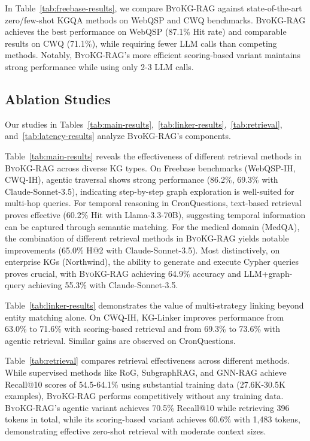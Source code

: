 \documentclass[11pt]{article}
\newcommand{\byokg}{\textsc{ByoKG-RAG}\xspace}
\newcommand{\glink}{KG-Linker\xspace}
\begin{document}


In Table~\ref{tab:freebase-results}, we compare \byokg against state-of-the-art zero/few-shot KGQA methods on WebQSP and CWQ benchmarks. \byokg achieves the best performance on WebQSP (87.1\% Hit rate) and comparable results on CWQ (71.1\%), while requiring fewer LLM calls than competing methods. Notably,  \byokg's more efficient scoring-based variant maintains strong performance while using only 2-3 LLM calls.





\subsection{Ablation Studies}

Our studies in Tables~\ref{tab:main-results},~\ref{tab:linker-results},~\ref{tab:retrieval},  and~\ref{tab:latency-results} analyze \byokg's components. 



Table~\ref{tab:main-results} reveals the effectiveness of different retrieval methods in \byokg across diverse KG types. On Freebase benchmarks (WebQSP-IH, CWQ-IH), agentic traversal shows strong performance (86.2\%, 69.3\% with Claude-Sonnet-3.5), indicating step-by-step graph exploration is well-suited for multi-hop queries. For temporal reasoning in CronQuestions, text-based retrieval proves effective (60.2\% Hit  with Llama-3.3-70B), suggesting temporal information can be captured through semantic matching. For the medical domain (MedQA), the combination of different retrieval methods in \byokg yields notable improvements (65.0\% H@2 with Claude-Sonnet-3.5). Most distinctively, on enterprise KGs (Northwind), the ability to generate and execute Cypher queries proves crucial, with \byokg achieving 64.9\% accuracy and LLM+graph-query achieving 55.3\% with Claude-Sonnet-3.5.








Table~\ref{tab:linker-results} demonstrates the value of multi-strategy linking beyond entity matching alone. On CWQ-IH, \glink improves performance from 63.0\% to 71.6\% with scoring-based retrieval and from 69.3\% to 73.6\% with agentic retrieval. Similar gains are observed on CronQuestions. 

Table~\ref{tab:retrieval} compares retrieval effectiveness across different methods. While supervised methods like RoG, SubgraphRAG, and GNN-RAG achieve Recall@10 scores of 54.5-64.1\% using substantial training data (27.6K-30.5K examples), \byokg performs competitively without any training data. \byokg's agentic variant achieves 70.5\% Recall@10 while retrieving 396 tokens in total, while its scoring-based variant achieves 60.6\% with 1,483 tokens, demonstrating effective zero-shot retrieval with moderate context sizes.
\end{document}
